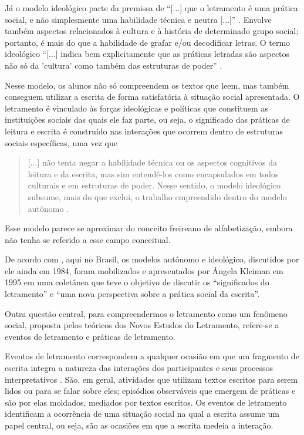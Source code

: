 \documentclass{textolivre}
\begin{document}
Já o modelo ideológico parte da premissa de “[...] que o letramento é uma
prática social, e não simplesmente uma habilidade técnica e neutra [...]”
\cite[p. 53]{street2014}. Envolve também aspectos relacionados à cultura e à
história de determinado grupo social; portanto, é mais do que a habilidade de
grafar e/ou decodificar letras. O termo ideológico “[...] indica bem
explicitamente que as práticas letradas são aspectos não só da ’cultura’ como
também das estruturas de poder” \cite[p. 172]{street2014}.

Nesse modelo, os alunos não só compreendem os textos que leem, mas também
conseguem utilizar a escrita de forma satisfatória à situação social
apresentada. O letramento é vinculado às forças ideológicas e políticas que
constituem as instituições sociais das quais ele faz parte, ou seja, o
significado das práticas de leitura e escrita é construído nas interações que
ocorrem dentro de estruturas sociais específicas, uma vez que
\begin{quote}
[...] não tenta negar a habilidade técnica ou os aspectos cognitivos da leitura
e da escrita, mas sim entendê-los como encapsulados em todos culturais e em
estruturas de poder. Nesse sentido, o modelo ideológico subsume, mais do que
exclui, o trabalho empreendido dentro do modelo autônomo \cite[p. 172]{street2014}.
\end{quote}

Esse modelo parece se aproximar do conceito freireano de alfabetização, embora
\textcite{street2014} não tenha se referido a esse campo conceitual.

De acordo com \textcite{street2014}, aqui no Brasil, os modelos autônomo e
ideológico, discutidos por ele ainda em 1984, foram mobilizados e apresentados
por Ângela Kleiman em 1995 em uma coletânea que teve o objetivo de discutir os
“significados do letramento” e “uma nova perspectiva sobre a prática social da
escrita”.

Outra questão central, para compreendermos o letramento como um fenômeno social, 
proposta pelos teóricos dos Novos Estudos do Letramento, refere-se a eventos de
letramento e práticas de letramento.

Eventos de letramento correspondem a qualquer ocasião em que um fragmento de
escrita integra a natureza das interações dos participantes e seus processos
interpretativos \cite{street2014}. São, em geral, atividades que utilizam textos
escritos para serem lidos ou para se falar sobre eles; episódios observáveis
que emergem de práticas e são por elas moldados, mediados por textos escritos.
Os eventos de letramento identificam a ocorrência de uma situação social na
qual a escrita assume um papel central, ou seja, são as ocasiões em que a
escrita medeia a interação.
\end{document}
